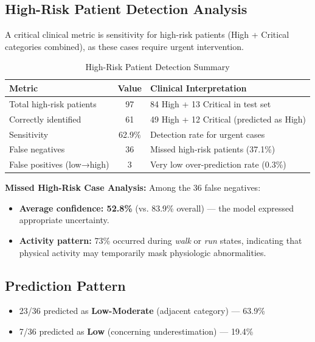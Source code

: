 \documentclass[3p,times,procedia]{elsarticle}
\begin{document}
\subsection{High-Risk Patient Detection Analysis}
A critical clinical metric is sensitivity for high-risk patients (High + Critical categories combined), as these cases require urgent intervention.

\begin{table}[!ht]
\centering
\caption{High-Risk Patient Detection Summary}
\small
\begin{tabular}{|l|c|l|}
\hline
\rowcolor{gray!20}
\textbf{Metric} & \textbf{Value} & \textbf{Clinical Interpretation} \\
\hline
Total high-risk patients & 97 & 84 High + 13 Critical in test set \\
\rowcolor{gray!10}
Correctly identified & 61 & 49 High + 12 Critical (predicted as High) \\
Sensitivity & 62.9\% & Detection rate for urgent cases \\
\rowcolor{gray!10}
False negatives & 36 & Missed high-risk patients (37.1\%) \\
False positives (low→high) & 3 & Very low over-prediction rate (0.3\%) \\
\hline
\end{tabular}
\end{table}

\textbf{Missed High-Risk Case Analysis:} Among the 36 false negatives:

\begin{itemize}
    \item \textbf{Average confidence: 52.8\%} (vs. 83.9\% overall) --- the model expressed appropriate uncertainty.
    \item \textbf{Activity pattern:} 73\% occurred during \textit{walk} or \textit{run} states, indicating that physical activity may temporarily mask physiologic abnormalities.
\end{itemize}

\subsection*{Prediction Pattern}
\begin{itemize}
    \item 23/36 predicted as \textbf{Low-Moderate} (adjacent category) --- 63.9\%
    \item 7/36 predicted as \textbf{Low} (concerning underestimation) --- 19.4\%
\end{itemize}
\end{document}
